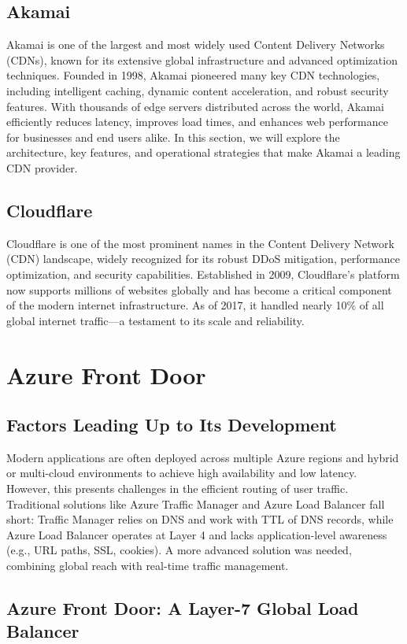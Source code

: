 \documentclass[12pt]{article}
\begin{document}
\subsection{Akamai}
Akamai is one of the largest and most widely used Content Delivery Networks (CDNs), known for its extensive global infrastructure and advanced optimization techniques. Founded in 1998, Akamai pioneered many key CDN technologies, including intelligent caching, dynamic content acceleration, and robust security features. With thousands of edge servers distributed across the world, Akamai efficiently reduces latency, improves load times, and enhances web performance for businesses and end users alike. In this section, we will explore the architecture, key features, and operational strategies that make Akamai a leading CDN provider.
\subsection{Cloudflare}
Cloudflare is one of the most prominent names in the Content Delivery Network (CDN) landscape, widely recognized for its robust DDoS mitigation, performance optimization, and security capabilities. Established in 2009, Cloudflare’s platform now supports millions of websites globally and has become a critical component of the modern internet infrastructure. As of 2017, it handled nearly 10\% of all global internet traffic—a testament to its scale and reliability.


\clearpage
\section{Azure Front Door}
\subsection{Factors Leading Up to Its Development}

Modern applications are often deployed across multiple Azure regions and hybrid or multi-cloud environments to achieve high availability and low latency. However, this presents challenges in the efficient routing of user traffic. Traditional solutions like Azure Traffic Manager and Azure Load Balancer fall short: Traffic Manager relies on DNS and work with TTL of DNS records, while Azure Load Balancer operates at Layer 4 and lacks application-level awareness (e.g., URL paths, SSL, cookies). A more advanced solution was needed, combining global reach with real-time traffic management.

\subsection{Azure Front Door: A Layer-7 Global Load Balancer}
\end{document}
